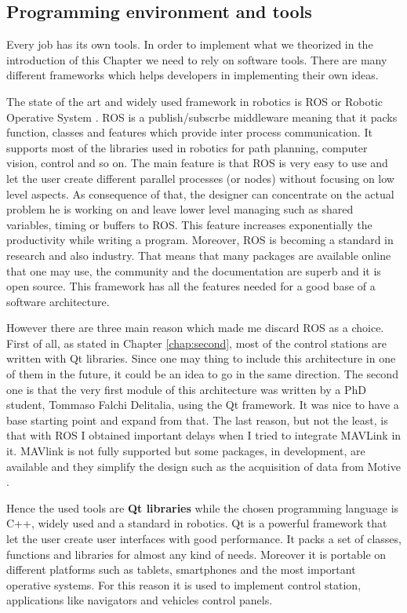 \subsection{Programming environment and tools}

Every job has its own tools. In order to implement what we theorized in the introduction of this Chapter we need to rely on software tools. There are many different frameworks which helps developers in implementing their own ideas.

 The state of the art and widely used framework in robotics is ROS or Robotic Operative System \cite{ROS}. ROS is a publish/subscrbe middleware meaning that it packs function, classes and features which provide inter process communication. It supports most of the libraries used in robotics for path planning, computer vision, control and so on. The main feature is that ROS is very easy to use and let the user create different parallel processes (or nodes) without focusing on low level aspects. As consequence of that, the designer can concentrate on the actual problem he is working on and leave lower level managing such as shared variables, timing or buffers to ROS. This feature increases exponentially the productivity while writing a program. Moreover, ROS is becoming a standard in research and also industry. That means that many packages are available online that one may use, the community and the documentation are superb and it is open source. This framework has all the features needed for a good base of a software architecture.
 
 However there are three main reason which made me discard ROS as a choice. First of all, as stated in Chapter \ref{chap:second}, most of the control stations are written with Qt libraries. Since one may thing to include this architecture in one of them in the future, it could be an idea to go in the same direction. The second one is that the very first module of this architecture was written by a PhD student, Tommaso Falchi Delitalia, using the Qt framework. It was nice to have a base starting point and expand from that. The last reason, but not the least, is that with ROS I obtained important delays when I tried to integrate MAVLink in it. MAVlink is not fully supported but some packages, in development, are available and they simplify the design such as the acquisition of data from Motive \cite{optiros}.

Hence the used tools are \textbf{Qt libraries} \cite{qt} while the chosen programming language is C++, widely used and a standard in robotics. Qt is a powerful framework that let the user create user interfaces with good performance. It packs a set of classes, functions and libraries for almost any kind of needs. Moreover it is portable on different platforms such as tablets, smartphones and the most important operative systems. For this reason it is used to implement control station, applications like navigators and vehicles control panels.

